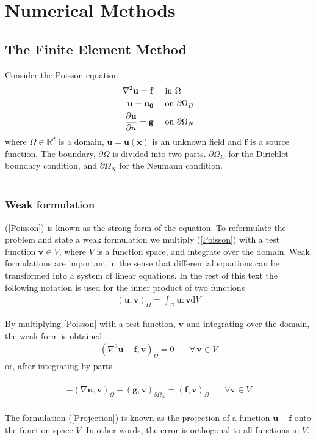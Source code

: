 \chapter{Numerical Methods}
\section{The Finite Element Method}
Consider the Poisson-equation
\begin{align}
\nabla^2 \mathbf{u} = \mathbf{f} & \quad \text{ in } \Omega \label{Poisson}\\
\mathbf{u} = \mathbf{u_0} & \quad \text{ on } \partial \label{Poisson_D}\Omega_D \\
\frac{\partial \mathbf{u}}{\partial n} = \mathbf{g} & \quad \text{ on } \partial \Omega_N \label{Poisson_N}
\end{align}
where $\Omega \in \mathbb{R}^d$ is a domain, $ \mathbf{u} = \mathbf{u}(\mathbf{x})$ is an unknown field and $\mathbf{f}$ is a source function. The boundary, $\partial \Omega$ is divided into two parts. $\partial \Omega_D$ for the Dirichlet boundary condition, and $\partial \Omega_N$ for the Neumann condition. 
\\
\\
\subsection{Weak formulation}
(\eqref{Poisson}) is known as the strong form of the equation. To reformulate the problem and state a weak formulation we multiply (\eqref{Poisson}) with a test function $\mathbf{v} \in V$, where $V$ is a function space, and integrate over the domain. Weak formulations are important in the sense that differential equations can be transformed into a system of linear equations. In the rest of this text the following notation is used for the inner product of two functions
\begin{align} (\mathbf{u},\mathbf{v})_{\Omega} = \int_{\Omega} \mathbf{u} : \mathbf{v} \mathrm{d}V \end{align}

By multiplying \eqref{Poisson} with a test function, $\mathbf{v}$ and integrating over the domain, the weak form is obtained
\begin{align}
(\nabla^2 \mathbf{u} - \mathbf{f}, \mathbf{v})_\Omega = 0 & \quad \forall \, \mathbf{v} \in V \label{Projection}
\end{align}
or, after integrating by parts \\ \\
\begin{align}
-(\nabla \mathbf{u}, \mathbf{v})_\Omega + (\mathbf{g}, \mathbf{v})_{\partial \Omega_N} = (\mathbf{f},\mathbf{v})_\Omega & \quad \forall \mathbf{v} \in V \label{Weak_form}
\end{align}
\\
The formulation (\eqref{Projection}) is known as the projection of a function $\mathbf{u} - \mathbf{f}$ onto the function space $V$. In other words, the error is orthogonal to all functions in $V$. 

